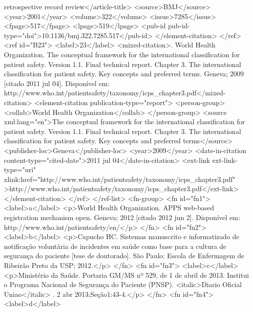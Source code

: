             retrospective record review</article-title>
          <source>BMJ</source>
          <year>2001</year>
          <volume>322</volume>
          <issue>7285</issue>
          <fpage>517</fpage>
          <lpage>519</lpage>
          <pub-id pub-id-type="doi">10.1136/bmj.322.7285.517</pub-id>
        </element-citation>
      </ref>
      <ref id="B23">
        <label>23</label>
        <mixed-citation>. World Health Organization. The conceptual framework for the international
          classification for patient safety. Version 1.1. Final technical report. Chapter 3. The
          international classification for patient safety. Key concepts and preferred terms. Geneva;
          2009 [citado 2011 jul 04]. Disponível em:
          http://www.who.int/patientsafety/taxonomy/icps_chapter3.pdf</mixed-citation>
        <element-citation publication-type="report">
          <person-group>
            <collab>World Health Organization</collab>
          </person-group>
          <source xml:lang="en">The conceptual framework for the international classification for
            patient safety. Version 1.1. Final technical report. Chapter 3. The international
            classification for patient safety. Key concepts and preferred terms</source>
          <publisher-loc>Geneva</publisher-loc>
          <year>2009</year>
          <date-in-citation content-type="cited-date">2011 jul 04</date-in-citation>
          <ext-link ext-link-type="uri"
            xlink:href="http://www.who.int/patientsafety/taxonomy/icps_chapter3.pdf"
            >http://www.who.int/patientsafety/taxonomy/icps_chapter3.pdf</ext-link>
        </element-citation>
      </ref>
    </ref-list>
    <fn-group>
      <fn id="fn1">
        <label>a</label>
        <p>World Health Organization. APPS web-based registration mechanism open. Geneva; 2012
          [citado 2012 jun 2]. Disponível em: http://www.who.int/patientsafety/en/</p>
      </fn>
      <fn id="fn2">
        <label>b</label>
        <p>Capucho HC. Sistemas manuscrito e informatizado de notificação voluntária de incidentes
          em saúde como base para a cultura de segurança do paciente [tese de doutorado]. São Paulo:
          Escola de Enfermagem de Ribeirão Preto da USP; 2012.</p>
      </fn>
      <fn id="fn3">
        <label>c</label>
        <p>Ministério da Saúde. Portaria GM/MS nº 529, de 1 de abril de 2013. Institui o Programa
          Nacional de Segurança do Paciente (PNSP). <italic>Diario Oficial Uniao</italic> . 2 abr
          2013;Seção1:43-4.</p>
      </fn>
      <fn id="fn4">
        <label>d</label>
